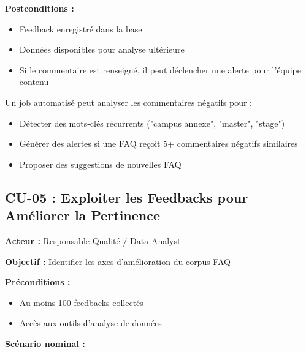 \documentclass[11pt,a4paper]{article}
\begin{document}
\textbf{Postconditions :}
\begin{itemize}
    \item Feedback enregistré dans la base
    \item Données disponibles pour analyse ultérieure
    \item Si le commentaire est renseigné, il peut déclencher une alerte pour l'équipe contenu
\end{itemize}

\begin{astuce}
Un job automatisé peut analyser les commentaires négatifs pour :
\begin{itemize}
    \item Détecter des mots-clés récurrents ("campus annexe", "master", "stage")
    \item Générer des alertes si une FAQ reçoit 5+ commentaires négatifs similaires
    \item Proposer des suggestions de nouvelles FAQ
\end{itemize}
\end{astuce}

\clearpage

\subsection{CU-05 : Exploiter les Feedbacks pour Améliorer la Pertinence}

\textbf{Acteur :} Responsable Qualité / Data Analyst

\textbf{Objectif :} Identifier les axes d'amélioration du corpus FAQ

\textbf{Préconditions :}
\begin{itemize}
    \item Au moins 100 feedbacks collectés
    \item Accès aux outils d'analyse de données
\end{itemize}

\textbf{Scénario nominal :}
\end{document}
